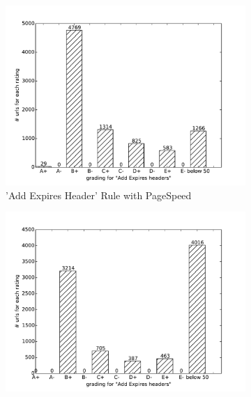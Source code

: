 \documentclass[conference]{IEEEtran}
\begin{document}
% 

\begin{figure}
    \centering
    \begin{subfigure}[b]{\columnwidth}        %
        \centering
	\includegraphics[scale=0.40]{img/virtual-labs/container/Add Expires headers.pdf}
        \caption{'Add Expires Header' Rule with PageSpeed}
        \label{fig:addexpireheader-pagespeed}
    \end{subfigure}
    \hfill
    \begin{subfigure}[b]{\columnwidth}        %
        \centering
  \includegraphics[scale=0.40]{img/virtual-labs/deploy/Add Expires headers.pdf}

\end{subfigure}
\end{figure}
\end{document}
